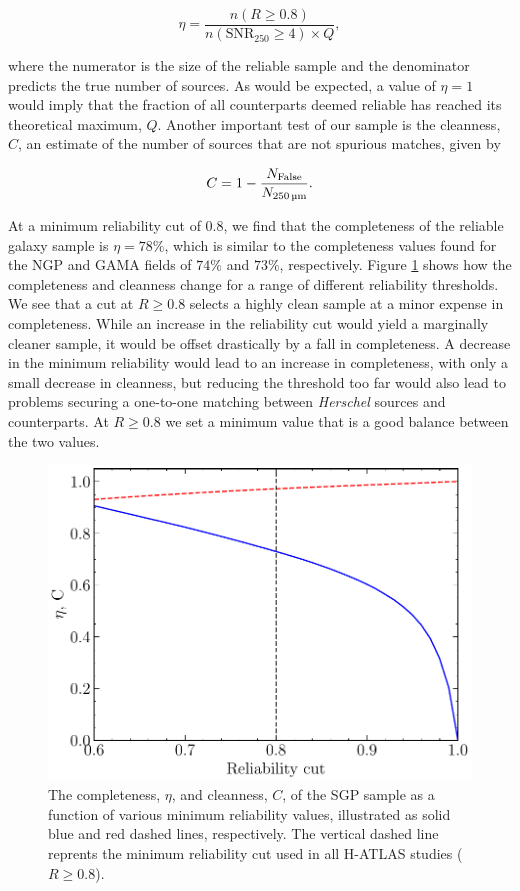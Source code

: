 \begin{equation}
    \eta = \frac{n(R \geq 0.8)}{n(\textrm{SNR}_{250} \geq 4) \times Q},
\label{eq:completeness}
\end{equation}

\noindent where the numerator is the size of the reliable sample and the denominator predicts the true number of sources. As would be expected, a value of $\eta = 1$ would imply that the fraction of all counterparts deemed reliable has reached its theoretical maximum, $Q$. Another important test of our sample is the cleanness, $C$, an estimate of the number of sources that are not spurious matches, given by

\begin{equation}
    C = 1 - \frac{N_{\textrm{False}}}{N_{\textrm{250\,\micron}}}.
\label{eq:cleanness}
\end{equation}

At a minimum reliability cut of $0.8$, we find that the completeness of the reliable galaxy sample is $\eta = 78\%$, which is similar to the completeness values found for the NGP and GAMA fields of $74\%$ and $73\%$, respectively. Figure \ref{fig:completeness_and_cleanness} shows how the completeness and cleanness change for a range of different reliability thresholds. We see that a cut at $R \geq 0.8$ selects a highly clean sample at a minor expense in completeness. While an increase in the reliability cut would yield a marginally cleaner sample, it would be offset drastically by a fall in completeness. A decrease in the minimum reliability would lead to an increase in completeness, with only a small decrease in cleanness, but reducing the threshold too far would also lead to problems securing a one-to-one matching between \textit{Herschel} sources and counterparts. At $R \geq 0.8$ we set a minimum value that is a good balance between the two values.

\begin{figure}
    \centering
	\includegraphics[width=0.8\columnwidth]{Figures/Figure_2_5.pdf}
	\caption[Completeness and cleanness of the SGP sample as a function of reliability]{The completeness, $\eta$, and cleanness, $C$, of the SGP sample as a function of various minimum reliability values, illustrated as solid blue and red dashed lines, respectively. The vertical dashed line reprents the minimum reliability cut used in all H-ATLAS studies ($R \geq 0.8$).}
	\label{fig:completeness_and_cleanness}
\end{figure}

